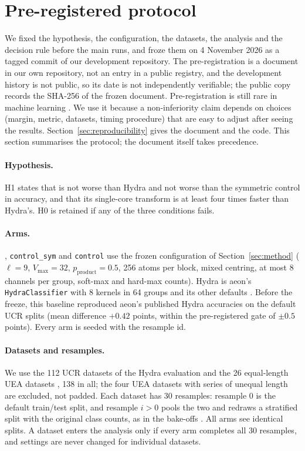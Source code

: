 \section{Pre-registered protocol}
\label{sec:protocol}

We fixed the hypothesis, the configuration, the datasets, the analysis and the decision rule
before the main runs, and froze them on 4 November 2026 as a tagged commit of our
development repository. The pre-registration is a document in our own repository, not an
entry in a public registry, and the development history is not public, so its date is
not independently verifiable; the public copy records the SHA-256 of the frozen document. Pre-registration is still rare in machine
learning \citep{prereg2020neurips}. We use it because a non-inferiority claim depends on
choices (margin, metric, datasets, timing procedure) that are easy to adjust after seeing
the results. Section~\ref{sec:reproducibility} gives the document and the code. This section
summarises the protocol; the document itself takes precedence.

\paragraph{Hypothesis.} H1 states that \hh{} is not worse than Hydra and not worse than the
symmetric control in accuracy, and that its single-core transform is at least four times
faster than Hydra's. H0 is retained if any of the three conditions fails.

\paragraph{Arms.} \hh{}, \texttt{control\_sym} and \texttt{control} use the frozen
configuration of Section~\ref{sec:method} ($\ell=9$, $V_{\max}=32$,
$p_{\text{product}}=0.5$, 256 atoms per block, mixed centring, at most 8 channels per
group, soft-max and hard-max counts). Hydra is aeon's \texttt{HydraClassifier} with 8
kernels in 64 groups and its other defaults \citep{dempster2023hydra,middlehurst2024aeon}.
Before the freeze, this baseline reproduced aeon's published Hydra accuracies on the
default UCR splits (mean difference $+0.42$ points, within the pre-registered gate
of $\pm0.5$ points). Every arm is seeded with the resample
id.

\paragraph{Datasets and resamples.} We use the 112 UCR datasets of the Hydra evaluation and
the 26 equal-length UEA datasets \citep{dau2019ucr,bagnall2018uea}, 138 in all; the four
UEA datasets with series of unequal length are excluded, not padded. Each dataset has 30
resamples: resample 0 is the default train/test split, and resample $i>0$ pools the two and
redraws a stratified split with the original class counts, as in the bake-offs
\citep{ruiz2021multivariate,middlehurst2024bakeoff}. All arms see identical splits. A
dataset enters the analysis only if every arm completes all 30 resamples, and settings are
never changed for individual datasets.

